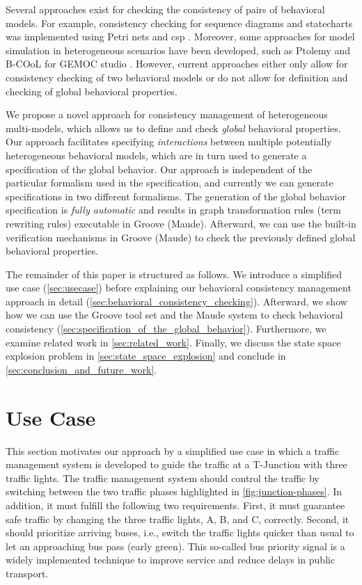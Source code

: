 \documentclass{jot}
\begin{document}
Several approaches exist for checking the consistency of pairs of behavioral models.
For example, consistency checking for sequence diagrams and statecharts was implemented using Petri nets \cite{yaoConsistencyCheckingUML2006} and \gls*{csp} \cite{kusterExplicitBehavioralConsistency2003}.
Moreover, some approaches for model simulation in heterogeneous scenarios have been developed, such as Ptolemy \cite{ekerTamingHeterogeneityPtolemy2003} and B-COoL for GEMOC studio \cite{varalarsenBehavioralCoordinationOperator2015}.
However, current approaches either only allow for consistency checking of two behavioral models or do not allow for definition and checking of global behavioral properties.

We propose a novel approach for consistency management of heterogeneous multi-models, which allows us to define and check \emph{global} behavioral properties.
Our approach facilitates specifying \emph{interactions} between multiple potentially heterogeneous behavioral models, which are in turn used to generate a specification of the global behavior.
Our approach is independent of the particular formalism used in the specification, and currently we can generate specifications in two different formalisms.
The generation of the global behavior specification is \emph{fully automatic} and results in graph transformation rules (term rewriting rules) executable in Groove (Maude).
Afterward, we can use the built-in verification mechanisms in Groove (Maude) to check the previously defined global behavioral properties.

The remainder of this paper is structured as follows.
We introduce a simplified use case (\autoref{sec:usecase}) before explaining our behavioral consistency management approach in detail (\autoref{sec:behavioral_consistency_checking}).
Afterward, we show how we can use the Groove tool set and the Maude system to check behavioral consistency (\autoref{sec:specification_of_the_global_behavior}).
Furthermore, we examine related work in \autoref{sec:related_work}.
Finally, we discuss the state space explosion problem in \autoref{sec:state_space_explosion} and conclude in \autoref{sec:conclusion_and_future_work}.


\section{Use Case} \label{sec:usecase}
This section motivates our approach by a simplified use case in which a traffic management system is developed to guide the traffic at a T-Junction with three traffic lights.
The traffic management system should control the traffic by switching between the two traffic phases highlighted in \cref{fig:junction-phases}.
In addition, it must fulfill the following two requirements.
First, it must guarantee safe traffic by changing the three traffic lights, A, B, and C, correctly.
Second, it should prioritize arriving buses, i.e., switch the traffic lights quicker than usual to let an approaching bus pass (early green).
This so-called bus priority signal is a widely implemented technique to improve service and reduce delays in public transport.
\end{document}

